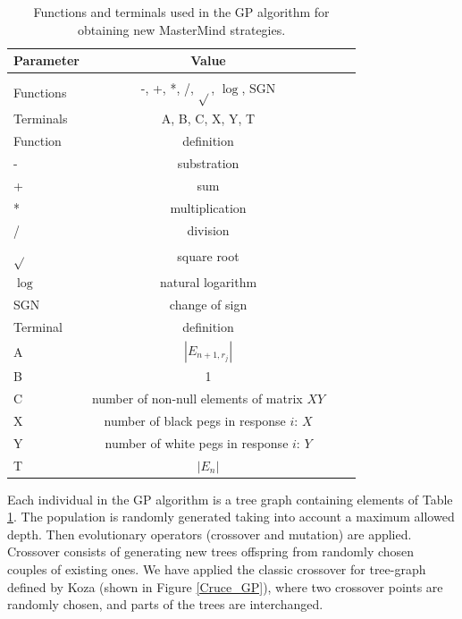\begin{table}[h!]
\centering
\caption{Functions and terminals used in the GP algorithm for obtaining new MasterMind strategies. \label{tab:GPparams}}
\begin{tabular}{lccc}
\hline
Parameter & Value \\
\hline \\
Functions  & -, +, *, /, $\sqrt{}$, $\log$, SGN\\
Terminals & A, B, C, X, Y, T\\
\hline
\hline
Function & definition\\
\hline
- & substration\\
+ & sum\\
* & multiplication\\
/ & division\\
$\sqrt{}$ & square root\\
$\log$ & natural logarithm\\
SGN & change of sign\\
\hline
\hline
Terminal & definition\\
\hline
A & $|E_{n+1,r_j}|$\\
B & 1 \\
C & number of non-null elements of matrix $XY$\\
X & number of black pegs in response $i$: $X$\\
Y & number of white pegs in response $i$: $Y$\\
T & $|E_{n}|$\\
\hline
\end{tabular}
\end{table}

Each individual in the GP algorithm is a tree graph containing
elements of Table \ref{tab:GPparams}. The population is randomly
generated taking into account a maximum allowed depth. Then
evolutionary operators (crossover and mutation) are applied. Crossover
consists of generating new trees offspring from randomly chosen
couples of existing ones. We have applied the classic crossover for
tree-graph defined by Koza \cite{Koza92b} %
(shown in Figure \ref{Cruce_GP}), where two crossover points are randomly chosen, and parts of the trees are interchanged.

